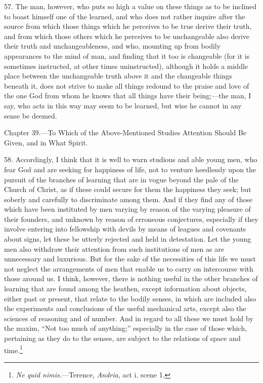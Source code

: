 57. The man, however, who puts so high a value on these things as to be inclined to boast himself one of the learned, and who does not rather inquire after the source from which those things which he perceives to be true derive their truth, and from which those others which he perceives to be unchangeable also derive their truth and unchangeableness, and who, mounting up from bodily appearances to the mind of man, and finding that it too is changeable (for it is sometimes instructed, at other times uninstructed), although it holds a middle place between the unchangeable truth above it and the changeable things beneath it, does not strive to make all things redound to the praise and love of the one God from whom he knows that all things have their being;—the man, I say, who acts in this way may seem to be learned, but wise he cannot in any sense be deemed.


Chapter 39.—To Which of the Above-Mentioned Studies Attention Should Be Given, and in What Spirit.

58. Accordingly, I think that it is well to warn studious and able young men, who fear God and are seeking for happiness of life, not to venture heedlessly upon the pursuit of the branches of learning that are in vogue beyond the pale of the Church of Christ, as if these could secure for them the happiness they seek; but soberly and carefully to discriminate among them. And if they find any of those which have been instituted by men varying by reason of the varying pleasure of their founders, and unknown by reason of erroneous conjectures, especially if they involve entering into fellowship with devils by means of leagues and covenants about signs, let these be utterly rejected and held in detestation. Let the young men also withdraw their attention from such institutions of men as are unnecessary and luxurious. But for the sake of the necessities of this life we must not neglect the arrangements of men that enable us to carry on intercourse with those around us. I think, however, there is nothing useful in the other branches of learning that are found among the heathen, except information about objects, either past or present, that relate to the bodily senses, in which are included also the experiments and conclusions of the useful mechanical arts, except also the sciences of reasoning and of number. And in regard to all these we must hold by the maxim, “Not too much of anything;” especially in the case of those which, pertaining as they do to the senses, are subject to the relations of space and time.\footnote{\emph{Ne quid nimis.}—Terence, \emph{Andria}, act i. scene 1.}

